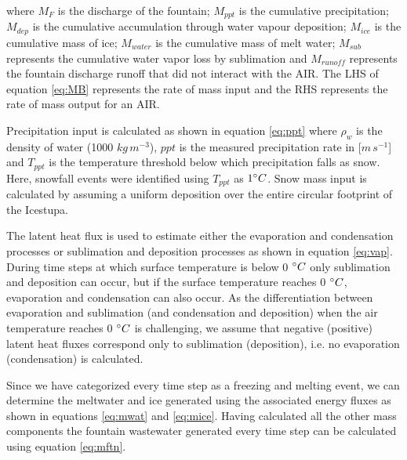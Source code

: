 \documentclass[utf8]{frontiersSCNS} %
\begin{document}
where $M_{F}$ is the discharge of the fountain; $M_{ppt}$ is the cumulative precipitation;  $M_{dep}$ is the cumulative
accumulation through water vapour deposition; $M_{ice}$ is the cumulative mass of ice; $M_{water}$ is the cumulative
mass of melt water; $M_{sub}$ represents the cumulative water vapor loss by sublimation and $M_{runoff}$ represents the
fountain discharge runoff that did not interact with the AIR. The LHS of equation \ref{eq:MB} represents the rate of
mass input and the RHS represents the rate of mass output for an AIR. 

Precipitation input is calculated as shown in equation \ref{eq:ppt} where $\rho_{w}$ is the density of water (1000
$kg\,m^{-3}$), $ppt$ is the measured precipitation rate in [$m\,s^{-1}$] and $T_{ppt}$ is the temperature threshold
below which precipitation falls as snow. Here, snowfall events were identified using $T_{ppt}$ as $1 \degree C$. Snow
mass input is calculated by assuming a uniform deposition over the entire circular footprint of the Icestupa. 

The latent heat flux is used to estimate either the evaporation and condensation processes or sublimation and deposition
processes as shown in equation \ref{eq:vap}. During time steps at which surface temperature is below 0 $\degree C$ only
sublimation and deposition can occur, but if the surface temperature reaches 0 $\degree C$, evaporation and condensation
can also occur. As the differentiation between evaporation and sublimation (and condensation and deposition) when the
air temperature reaches 0 $\degree C$ is challenging, we assume that negative (positive) latent heat fluxes correspond
only to sublimation (deposition), i.e. no evaporation (condensation) is calculated.

Since we have categorized every time step as a freezing and melting event, we can determine the meltwater and  ice
generated using the associated energy fluxes as shown in equations \ref{eq:mwat} and \ref{eq:mice}. Having
calculated all the other mass components the fountain wastewater generated every time step can be calculated using
equation \ref{eq:mftn}.
\end{document}
